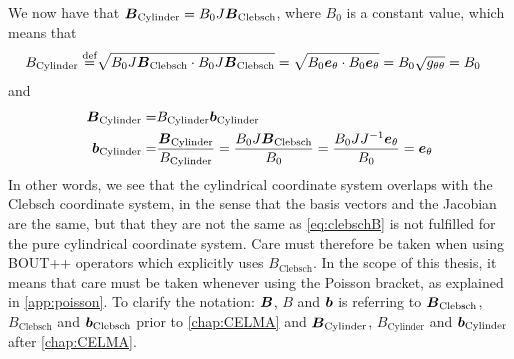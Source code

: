 %
We now have that $\boldsymbol{B}_{\text{Cylinder}}=B_0J\boldsymbol{B}_{\text{Clebsch}}$, where $B_0$ is a constant value, which means that
%
\begin{align*}
    B_{\text{Cylinder}}\overset{\text{def}}{=} &
    \sqrt{B_0J\boldsymbol{B}_{\text{Clebsch}}\cdot B_0J\boldsymbol{B}_{\text{Clebsch}}}
    = \sqrt{B_0\boldsymbol{e}_\theta\cdot B_0\boldsymbol{e}_\theta}
    = B_0\sqrt{g_{\theta\theta}}
    = B_0
\end{align*}
%
and
%
\begin{align*}
    \boldsymbol{B}_{\text{Cylinder}}=&B_{\text{Cylinder}}\boldsymbol{b}_{\text{Cylinder}}\\
    \boldsymbol{b}_{\text{Cylinder}}
    =&\frac{\boldsymbol{B}_{\text{Cylinder}}}{B_{\text{Cylinder}}}
    =\frac{B_0J\boldsymbol{B}_{\text{Clebsch}}}{B_0}
    =\frac{B_0JJ^{-1}\boldsymbol{e}_\theta}{B_0}
    =\boldsymbol{e}_\theta
\end{align*}
%
In other words, we see that the cylindrical coordinate system overlaps with the Clebsch coordinate system, in the sense that the basis vectors and the Jacobian are the same, but that they are not the same as \cref{eq:clebschB} is not fulfilled for the pure cylindrical coordinate system.
Care must therefore be taken when using BOUT++ operators which explicitly uses ${B}_{\text{Clebsch}}$.
In the scope of this thesis, it means that care must be taken whenever using the Poisson bracket, as explained in \cref{app:poisson}.
To clarify the notation: $\boldsymbol{B}$, $B$ and $\boldsymbol{b}$ is referring to $\boldsymbol{B}_{\text{Clebsch}}$, $B_{\text{Clebsch}}$ and $\boldsymbol{b}_{\text{Clebsch}}$ prior to \cref{chap:CELMA} and $\boldsymbol{B}_{\text{Cylinder}}$, $B_{\text{Cylinder}}$ and $\boldsymbol{b}_{\text{Cylinder}}$ after \cref{chap:CELMA}.
